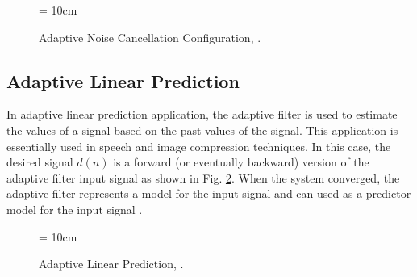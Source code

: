 \begin{figure}[h]
\begin{center}
\vspace{1cm}
\epsfxsize = 10cm
\end{center}
\vspace{-1cm}
\caption{Adaptive Noise Cancellation Configuration, \cite{shukur}.}
\label{fig4x}
\vspace{1.5cm}
\end{figure}

\vspace{-0.3cm}
\subsection{Adaptive Linear Prediction}\label{sec:1.3.3}
\vspace{-0.5cm}
\noindent In adaptive linear prediction application, the adaptive filter is used to estimate the values of a signal based on the past values of the signal. This application is essentially used in speech and image compression techniques. In this case, the desired signal $d(n)$ is a forward (or eventually backward) version of the adaptive filter input signal as shown in Fig. \ref{fig5x}. When the system converged, the adaptive filter represents a model  for the input signal and can used as a predictor model for the input signal \cite{Li}.

\begin{figure}[h]
\begin{center}
\vspace{1cm}
\epsfxsize = 10cm
\end{center}
\vspace{-1cm}
\caption{Adaptive Linear Prediction, \cite{shukur}.}
\label{fig5x}
\vspace{1.5cm}
\end{figure}



\vspace{-0.3cm}
